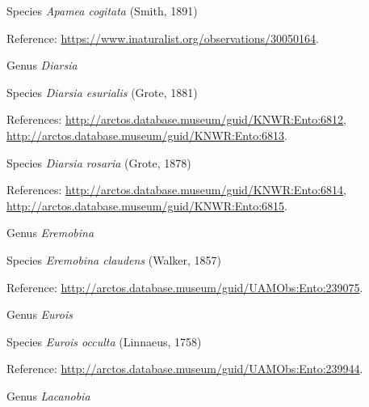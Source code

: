 \documentclass[9pt, article]{memoir}
\begin{document}
\begin{multicols}{2}
\vspace{6pt}\noindent\hspace{36pt}Species \textit{Apamea cogitata} (Smith, 1891)


\vspace{6pt}Reference: 
\url{https://www.inaturalist.org/observations/30050164}.

\vspace{6pt}\noindent\hspace{30pt}Genus \textit{Diarsia}


\vspace{6pt}\noindent\hspace{36pt}Species \textit{Diarsia esurialis} (Grote, 1881)


\vspace{6pt}References: 
\url{http://arctos.database.museum/guid/KNWR:Ento:6812}, 
\url{http://arctos.database.museum/guid/KNWR:Ento:6813}.

\vspace{6pt}\noindent\hspace{36pt}Species \textit{Diarsia rosaria} (Grote, 1878)


\vspace{6pt}References: 
\url{http://arctos.database.museum/guid/KNWR:Ento:6814}, 
\url{http://arctos.database.museum/guid/KNWR:Ento:6815}.

\vspace{6pt}\noindent\hspace{30pt}Genus \textit{Eremobina}


\vspace{6pt}\noindent\hspace{36pt}Species \textit{Eremobina claudens} (Walker, 1857)


\vspace{6pt}Reference: 
\url{http://arctos.database.museum/guid/UAMObs:Ento:239075}.

\vspace{6pt}\noindent\hspace{30pt}Genus \textit{Eurois}


\vspace{6pt}\noindent\hspace{36pt}Species \textit{Eurois occulta} (Linnaeus, 1758)


\vspace{6pt}Reference: 
\url{http://arctos.database.museum/guid/UAMObs:Ento:239944}.

\vspace{6pt}\noindent\hspace{30pt}Genus \textit{Lacanobia}



\end{multicols}
\end{document}
